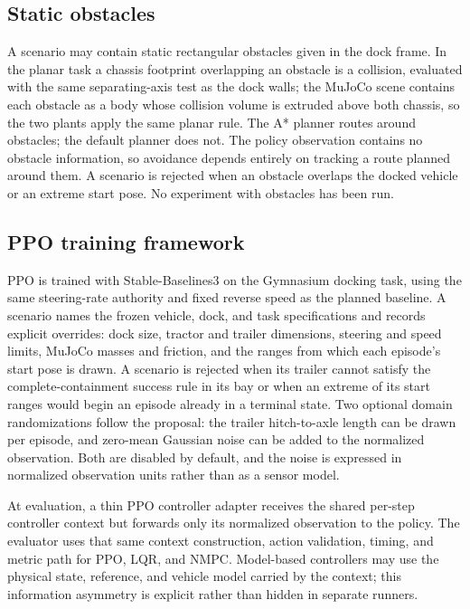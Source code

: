 \subsection{Static obstacles}

\implemented{} A scenario may contain static rectangular obstacles given in the
dock frame. In the planar task a chassis footprint overlapping an obstacle is
a collision, evaluated with the same separating-axis test as the dock walls;
the MuJoCo scene contains each obstacle as a body whose collision volume is
extruded above both chassis, so the two plants apply the same planar rule.
The A* planner routes around obstacles; the default planner does not. The
policy observation contains no obstacle information, so avoidance depends
entirely on tracking a route planned around them. A scenario is rejected when
an obstacle overlaps the docked vehicle or an extreme start pose. No
experiment with obstacles has been run.

\subsection{PPO training framework}

\implemented{} PPO is trained with Stable-Baselines3 \cite{raffin2021sb3} on
the Gymnasium docking task, using the same steering-rate authority and fixed
reverse speed as the planned baseline. A scenario names the frozen vehicle,
dock, and task specifications and records explicit overrides: dock size,
tractor and trailer dimensions, steering and speed limits, MuJoCo masses and
friction, and the ranges from which each episode's start pose is drawn. A
scenario is rejected when its trailer cannot satisfy the complete-containment
success rule in its bay or when an extreme of its start ranges would begin an
episode already in a terminal state. Two
optional domain randomizations follow the proposal: the trailer
hitch-to-axle length can be drawn per episode, and zero-mean Gaussian noise
can be added to the normalized observation. Both are disabled by default, and
the noise is expressed in normalized observation units rather than as a
sensor model.

At evaluation, a thin PPO controller adapter receives the shared per-step
controller context but forwards only its normalized observation to the policy.
The evaluator uses that same context construction, action validation, timing,
and metric path for PPO, LQR, and NMPC. Model-based controllers may use the
physical state, reference, and vehicle model carried by the context; this
information asymmetry is explicit rather than hidden in separate runners.

